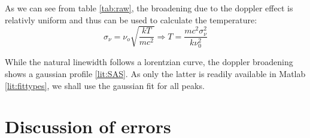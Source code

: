 As we can see from table \ref{tab:raw}, the broadening due to the doppler effect is relativly uniform and thus can be used to calculate the temperature:
\begin{equation}
 \sigma_\nu = \nu_o \sqrt{\frac{k T}{m c^2}} \Longrightarrow T = \frac{m c^2 \sigma_\nu^2}{k\nu_0^2}
\end{equation}






While the natural linewidth follows a lorentzian curve, the doppler broadening shows a gaussian profile \ref{lit:SAS}. As only the latter is readily available in Matlab \ref{lit:fittypes}, we shall use the gaussian fit for all peaks.







\section{Discussion of errors}
